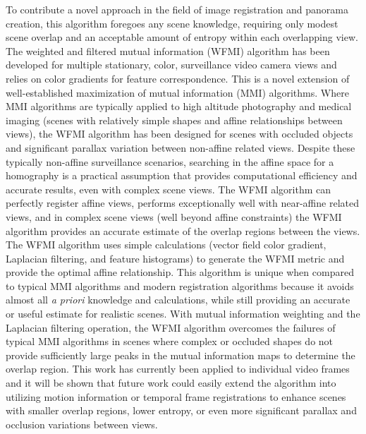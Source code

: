 %
%
%
%
%
%
%

%
%


To contribute a novel approach in the field of image registration and panorama creation, this algorithm foregoes any scene knowledge, requiring only modest scene overlap and an acceptable amount of entropy within each overlapping view. The weighted and filtered mutual information (WFMI) algorithm has been developed for multiple stationary, color, surveillance video camera views and relies on color gradients for feature correspondence. This is a novel extension of well-established maximization of mutual information (MMI) algorithms. Where MMI algorithms are typically applied to high altitude photography and medical imaging (scenes with relatively simple shapes and affine relationships between views), the WFMI algorithm has been designed for scenes with occluded objects and significant parallax variation between non-affine related views. Despite these typically non-affine surveillance scenarios, searching in the affine space for a homography is a practical assumption that provides computational efficiency and accurate results, even with complex scene views. The WFMI algorithm can perfectly register affine views, performs exceptionally well with near-affine related views, and in complex scene views (well beyond affine constraints) the WFMI algorithm provides an accurate estimate of the overlap regions between the views. The WFMI algorithm uses simple calculations (vector field color gradient, Laplacian filtering, and feature histograms) to generate the WFMI metric and provide the optimal affine relationship. This algorithm is unique when compared to typical MMI algorithms and modern registration algorithms because it avoids almost all \textit{a priori} knowledge and calculations, while still providing an accurate or useful estimate for realistic scenes. With mutual information weighting and the Laplacian filtering operation, the WFMI algorithm overcomes the failures of typical MMI algorithms in scenes where complex or occluded shapes do not provide sufficiently large peaks in the mutual information maps to determine the overlap region. This work has currently been applied to individual video frames and it will be shown that future work could easily extend the algorithm into utilizing motion information or temporal frame registrations to enhance scenes with smaller overlap regions, lower entropy, or even more significant parallax and occlusion variations between views.

